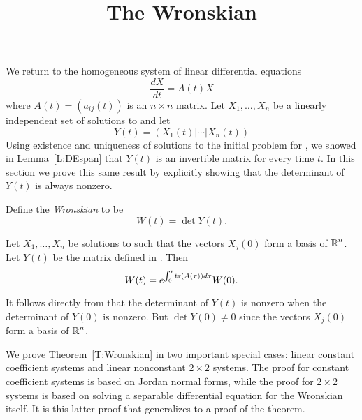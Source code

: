 \documentclass{ximera}
\title{The Wronskian}
\begin{document}
\begin{abstract}
\end{abstract}
\maketitle

  \label{S:wronskian}

We return to the homogeneous system of linear differential equations
\arraystart
\begin{equation}  \label{eq:linihsys2}
\frac{dX}{dt}  =  A(t)X
\end{equation}
\arrayfinish
where $A(t)=(a_{ij}(t))$ is an $n\times n$ matrix.  Let $X_1,\ldots,X_n$ be a 
linearly independent set of solutions 
to  and let 
\begin{equation}   \label{E:Y(t)2}
Y(t) = \left(X_1(t)|\cdots |X_n(t)\right) 
\end{equation}
Using existence and uniqueness of solutions to the initial problem for
, we showed in Lemma~\ref{L:DEspan} that $Y(t)$ is an 
invertible matrix for every time $t$.  In this section we prove this same 
result by explicitly showing that the determinant 
of $Y(t)$ is always nonzero.

Define the {\em Wronskian\/} to be
\[
W(t) = \det Y(t).
\]

\begin{thm}  \label{T:Wronskian}
Let $X_1,\ldots,X_n$ be solutions to  such that the vectors
$X_j(0)$ form a basis of $\mbox{$\Bbb{R}$}^n$.  Let $Y(t)$ be the matrix defined in 
.  Then
\begin{equation}  \label{L:Wronskian}
W(t) = e^{\int_0^t{\rm tr}(A(\tau))d\tau}W(0).
\end{equation}
\end{thm}

It follows directly from  that the determinant of $Y(t)$ is 
nonzero when the determinant of $Y(0)$ is nonzero.  But $\det Y(0)\neq 0$ 
since the vectors $X_j(0)$ form a basis of $\mbox{$\Bbb{R}$}^n$. 

We prove Theorem~\ref{T:Wronskian} in two important special cases: linear 
constant coefficient systems and linear nonconstant $2\times 2$ systems.  
The proof for constant coefficient systems is based on Jordan normal forms, 
while the proof for $2\times 2$ systems is based on solving a separable 
differential equation for the Wronskian itself.  It is this latter proof 
that generalizes to a proof of the theorem.
\end{document}
